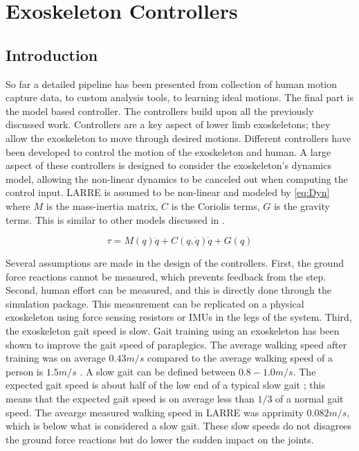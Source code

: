 \chapter{Exoskeleton Controllers}

\section{Introduction}
So far a detailed pipeline has been presented from collection of human motion capture data, to custom analysis tools, to learning ideal motions. The final part is the model based controller. The controllers build upon all the previously discussed work.  
Controllers are a key aspect of lower limb exoskeletons; they allow the exoskeleton to move through desired motions. Different controllers have been developed to control the motion of the exoskeleton and human. A large aspect of these controllers is designed to consider the exoskeleton's dynamics model, allowing the non-linear dynamics to be canceled out when computing the control input. LARRE is assumed to be non-linear and modeled by \autoref{eq:Dyn} where $M$ is the mass-inertia matrix, $C$ is the Coriolis terms, $G$ is the gravity terms. This is similar to other models discussed in \cite{huo2016active} \cite{vantilt2019model}.

\begin{equation}
    \tau = M(q) \ddot{q} + C(q, \dot{q}) \dot{q} + G(q)
    \label{eq:Dyn}
\end{equation}


Several assumptions are made in the design of the controllers. First, the ground force reactions cannot be measured, which prevents feedback from the step. Second, human effort can be measured, and this is directly done through the simulation package. This measurement can be replicated on a physical exoskeleton using force sensing resistors or IMUs in the legs of the system. Third, the exoskeleton gait speed is slow. Gait training using an exoskeleton has been shown to improve the gait speed of paraplegics. The average walking speed after training was on average $0.43m/s$ \cite{khan2019retraining} compared to the average walking speed of a person is $1.5m/s$ \cite{fitzpatrick2006another}. A slow gait can be defined between $0.8-1.0m/s$. The expected gait speed is about half of the low end of a typical slow gait \cite{walsh2007quasi}; this means that the expected gait speed is on average less than $1/3$ of a normal gait speed. The avearge measured walking speed in LARRE was apprimity $0.082m/s$, which is below what is considered a slow gait. These slow speeds do not disagrees the ground force reactions but do lower the sudden impact on the joints. 


